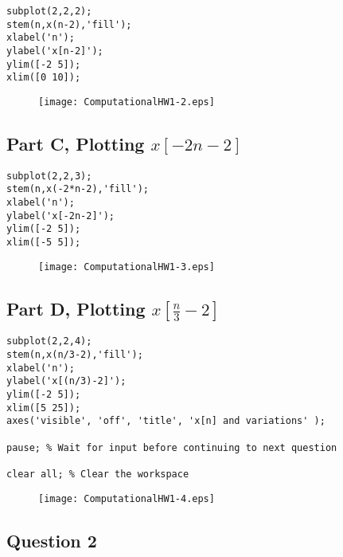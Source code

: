 \documentclass[10pt]{article}
\begin{document}
\begin{lstlisting}
subplot(2,2,2);
stem(n,x(n-2),'fill');
xlabel('n');
ylabel('x[n-2]');
ylim([-2 5]);
xlim([0 10]);
\end{lstlisting}
\begin{figure}[H]
\texttt{[image: ComputationalHW1-2.eps]}
\end{figure}


{}
\subsection*{Part C, Plotting $x[-2n-2]$}

\begin{lstlisting}
subplot(2,2,3);
stem(n,x(-2*n-2),'fill');
xlabel('n');
ylabel('x[-2n-2]');
ylim([-2 5]);
xlim([-5 5]);
\end{lstlisting}
\begin{figure}[H]
\texttt{[image: ComputationalHW1-3.eps]}
\end{figure}


{}
\subsection*{Part D, Plotting $x\left[\frac{n}{3}-2\right]$}

\begin{lstlisting}
subplot(2,2,4);
stem(n,x(n/3-2),'fill');
xlabel('n');
ylabel('x[(n/3)-2]');
ylim([-2 5]);
xlim([5 25]);
axes('visible', 'off', 'title', 'x[n] and variations' );

pause; % Wait for input before continuing to next question

clear all; % Clear the workspace
\end{lstlisting}
\begin{figure}[H]
\texttt{[image: ComputationalHW1-4.eps]}
\end{figure}


{}
\subsection*{Question 2}
\end{document}
